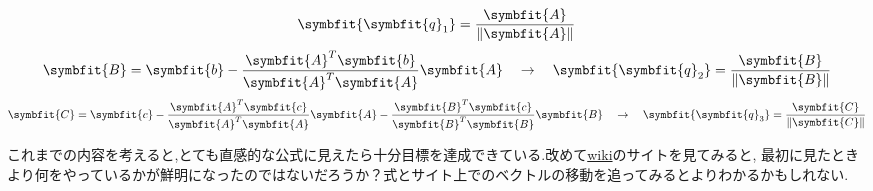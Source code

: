 \hypertarget{Gram}{}
\begin{tcolorbox}[colframe=black!80,colback=white,title=射影からグラム--シュミットの正規直交化法(途中)へ]
\[\symbfit{\symbfit{q}_1}=\displaystyle\frac{\symbfit{A}}{\|\symbfit{A}\|}\]
\[\symbfit{B}=\symbfit{b}-\displaystyle\frac{\symbfit{A}^T\symbfit{b}}{\symbfit{A}^T\symbfit{A}}\symbfit{A}\quad \rightarrow \quad \symbfit{\symbfit{q}_2}=\displaystyle\frac{\symbfit{B}}{\|\symbfit{B}\|}\]
\[\symbfit{C}=\symbfit{c}-
\displaystyle\frac{\symbfit{A}^T\symbfit{c}}{\symbfit{A}^T\symbfit{A}}\symbfit{A}-
\displaystyle\frac{\symbfit{B}^T\symbfit{c}}{\symbfit{B}^T\symbfit{B}}\symbfit{B}\quad \rightarrow \quad \symbfit{\symbfit{q}_3}=\displaystyle\frac{\symbfit{C}}{\|\symbfit{C}\|}\]
\end{tcolorbox}
これまでの内容を考えると,とても直感的な公式に見えたら十分目標を達成できている.改めて\hyperlink{wiki}{wiki}のサイトを見てみると,
最初に見たときより何をやっているかが鮮明になったのではないだろうか？式とサイト上でのベクトルの移動を追ってみるとよりわかるかもしれない.

